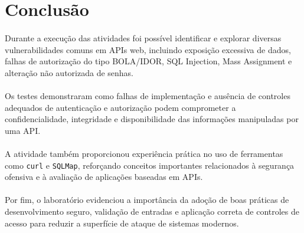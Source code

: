 \section{Conclusão}

\paragraph{}
Durante a execução das atividades foi possível identificar e explorar diversas
vulnerabilidades comuns em APIs web, incluindo exposição excessiva de dados,
falhas de autorização do tipo BOLA/IDOR, SQL Injection, Mass Assignment e
alteração não autorizada de senhas.

\paragraph{}
Os testes demonstraram como falhas de implementação e ausência de controles
adequados de autenticação e autorização podem comprometer a confidencialidade,
integridade e disponibilidade das informações manipuladas por uma API.

\paragraph{}
A atividade também proporcionou experiência prática no uso de ferramentas como
\texttt{curl} e \texttt{SQLMap}, reforçando conceitos importantes relacionados
à segurança ofensiva e à avaliação de aplicações baseadas em APIs.

\paragraph{}
Por fim, o laboratório evidenciou a importância da adoção de boas práticas de
desenvolvimento seguro, validação de entradas e aplicação correta de controles
de acesso para reduzir a superfície de ataque de sistemas modernos.
